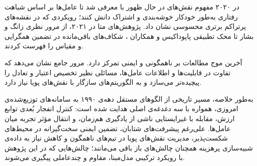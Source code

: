 در ۲۰۲۰ مفهوم نقش‌های در حال ظهور با  \cite{Wang2020ROMA} معرفی شد تا عامل‌ها بر اساس شباهت رفتاری به‌طور خودکار خوشه‌بندی و اشتراک دانش کنند؛ رویکردی که در نقشه‌های پرتراکم  برتری محسوسی نشان داد. پژوهش‌های متا در ۲۰۲۱، از مرور نظری زانگ و بشار \cite{Zhang2021Survey} تا 
محک
 تطبیقی پاپوداکیس و همکاران
\cite{9583665}،
 شکاف‌های باقی‌مانده در تضمین همگرایی و مقیاس را فهرست کردند. 

آخرین موج مطالعات بر ناهمگونی و ایمنی تمرکز دارد. مرور جامع \cite{Yu2022Heterogeneous} نشان می‌دهد که تفاوت در قابلیت‌ها و اطلاعات عامل‌ها، مسائلی نظیر تخصیص اعتبار و تعادل را پیچیده‌تر می‌سازد و به الگوریتم‌های سازگار با نقش‌های پویا نیاز دارد.

به‌طور خلاصه، مسیر تاریخی  از الگوهای مستقل دهه‌ی ۱۹۹۰ به سامانه‌های توزیع‌شده‌ی امروزی، همواره با سه دغدغه‌ی اصلی هدایت شده است: کنترل انفجار بُعدی توابع ارزش، مقابله با غیرایستایی ناشی از یادگیری هم‌زمان، و انتقال مؤثر تجربه میان عامل‌ها. علی‌رغم پیشرفت‌های شتابان، تضمین ایمنی سخت‌گیرانه در محیط‌های شکست‌پذیر، مدیریت نقش‌های پویا در تیم‌های ناهمگون و کاهش نیاز به داده‌ی شبیه‌سازی پرهزینه همچنان چالش‌های باز باقی می‌مانند؛ چالش‌هایی که در این پژوهش با رویکرد ترکیبی مدل‌مبنا، مقاوم و چندعاملی پیگیری می‌شوند.
